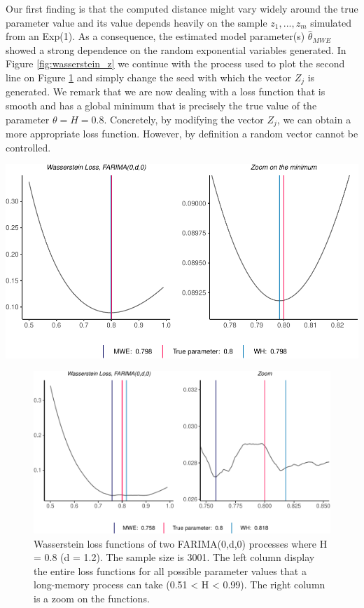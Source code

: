 \documentclass[
  11pt,
]{article}
\begin{document}
Our first finding is that the computed distance might vary widely around
the true parameter value and its value depends heavily on the sample
\(z_1, ..., z_m\) simulated from an Exp(1). As a consequence, the
estimated model parameter(s) \(\hat \theta_{MWE}\) showed a strong
dependence on the random exponential variables generated. In Figure
\ref{fig:wasserstein_z} we continue with the process used to plot the
second line on Figure \ref{fig:wasserstein_farima} and simply change the
seed with which the vector \(Z_j\) is generated. We remark that we are
now dealing with a loss function that is smooth and has a global minimum
that is precisely the true value of the parameter \(\theta = H = 0.8\).
Concretely, by modifying the vector \(Z_j\), we can obtain a more
appropriate loss function. However, by definition a random vector cannot
be controlled.

\hfill\break

\begin{center}\includegraphics[width=0.6\linewidth]{Master_thesis_V1_files/figure-latex/unnamed-chunk-2-1} \end{center}

\begin{figure}[h]

{\centering \includegraphics[width=0.6\linewidth]{Master_thesis_V1_files/figure-latex/wasserstein_farima-1} 

}

\caption{Wasserstein loss functions of two FARIMA(0,d,0) processes where H = 0.8 (d = 1.2). The sample size is 3001. The left column display the entire loss functions for all possible parameter values that a long-memory process can take (0.51 < H < 0.99). The right column is a zoom on the functions.}\label{fig:wasserstein_farima}
\end{figure}
\end{document}
